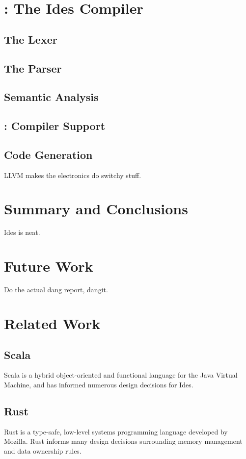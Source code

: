 \section{: The Ides Compiler}
\subsection{The Lexer}


\subsection{The Parser}


\subsection{Semantic Analysis}


\subsection{: Compiler Support}


\subsection{Code Generation}
LLVM makes the electronics do switchy stuff.

\section{Summary and Conclusions}
Ides is neat.

\section{Future Work}
Do the actual dang report, dangit.

\section{Related Work}
\subsection{Scala}
Scala\cite{key:scala} is a hybrid object-oriented and functional language for the Java Virtual Machine, and has informed numerous design decisions for Ides.

\subsection{Rust}
Rust is a type-safe, low-level systems programming language developed by Mozilla. Rust informs many design decisions surrounding memory management and data ownership rules. 

